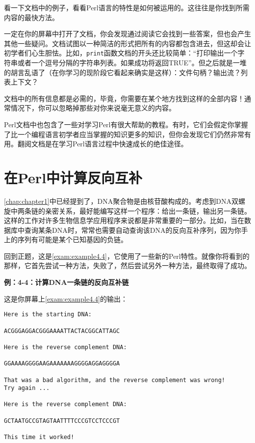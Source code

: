 看一下文档中的例子，看看Perl语言的特性是如何被运用的。这往往是你找到所需内容的最快方法。

一定在你的屏幕中打开了文档，你会发现通过阅读它会找到一些答案，但也会产生其他一些疑问。文档试图以一种简洁的形式把所有的内容都包含进去，但这却会让初学者们心生胆怯。比如，\verb|print|函数文档的开头还比较简单：“打印输出一个字符串或者一个逗号分隔的字符串列表。如果成功将返回TRUE”。但之后就是一堆的胡言乱语了（在你学习的现阶段它看起来确实是这样）：文件句柄？输出流？列表上下文？

文档中的所有信息都是必需的，毕竟，你需要在某个地方找到这样的全部内容！通常情况下，你可以忽略掉那些对你来说毫无意义的内容。

Perl文档中也包含了一些对学习Perl有很大帮助的教程。有时，它们会假定你掌握了比一个编程语言初学者应当掌握的知识更多的知识，但你会发现它们仍然非常有用。翻阅文档是在学习Perl语言过程中快速成长的绝佳途径。

\section{在Perl中计算反向互补}
\autoref{chap:chapter1}中已经提到了，DNA聚合物是由核苷酸构成的。考虑到DNA双螺旋中两条链的亲密关系，最好能编写这样一个程序：给出一条链，输出另一条链。这样的工作对许多生物信息学应用程序来说都是非常重要的一部分。比如，当在数据库中查询某条DNA时，常常也需要自动查询该DNA的反向互补序列，因为你手上的序列有可能是某个已知基因的负链。

回到正题，这是\autoref{exam:example4.4}，它使用了一些新的Perl特性。就像你将看到的那样，它首先尝试一种方法，失败了，然后尝试另外一种方法，最终取得了成功。

\textbf{例：4-4：计算DNA一条链的反向互补链}



这是你屏幕上\autoref{exam:example4.4}的输出：

\begin{lstlisting}
Here is the starting DNA:

ACGGGAGGACGGGAAAATTACTACGGCATTAGC

Here is the reverse complement DNA:

GGAAAAGGGGAAGAAAAAAAGGGGAGGAGGGGA

That was a bad algorithm, and the reverse complement was wrong!
Try again ...

Here is the reverse complement DNA:

GCTAATGCCGTAGTAATTTTCCCGTCCTCCCGT

This time it worked!
\end{lstlisting}

